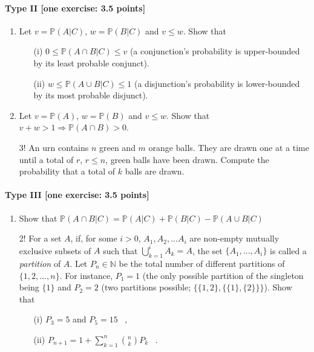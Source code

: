 \documentclass{article}
\begin{document}
\paragraph{Type II [one exercise: 3.5 points]}
\begin{enumerate}
	\item Let $v = \mathbb{P}(A|C)$, $w = \mathbb{P}(B|C)$ and $v \leq w$. Show that 
	\begin{itemize}
		\item [(i)] $0 \leq \mathbb{P}(A \cap B|C) \leq v$ (a conjunction's probability is upper-bounded by its least probable conjunct).	 \item[(ii)] $w \leq \mathbb{P}(A \cup B|C) \leq 1$ (a disjunction's probability is lower-bounded by its most probable disjunct).
	\end{itemize}
\item Let $v = \mathbb{P}(A)$, $w = \mathbb{P}(B)$ and $v \leq w$. Show that $v + w > 1 \Rightarrow \mathbb{P}(A \cap B) > 0$.
\item[3!] An urn contains $n$ green and $m$ orange balls. They are drawn one at a time until a total of $r$, $r \leq n$, green balls have been drawn. Compute the probability that a total of $k$ balls are drawn.

\end{enumerate}



\paragraph{Type III [one exercise: 3.5 points]}
\begin{enumerate}
	\item Show that $\mathbb{P}(A \cap B|C) = \mathbb{P}(A|C) + \mathbb{P}(B|C) - \mathbb{P}(A \cup B|C)$ %
	\item[2!] For a set $A$, if, for some $i > 0$, $A_1, A_2, ... A_i$ are non-empty mutually exclusive subsets of $A$ such that $\bigcup_{k=1}^{i}A_k = A$, the set $\{A_1, ..., A_i\}$ is called a \emph{partition} of $A$. Let $P_n \in \mathbb{N}$ be the total number of different partitions of $\{1,2,...,n\}$. For instance, $P_1 = 1$ (the only possible partition of the singleton being $\{1\}$ and $P_2 = 2$ (two partitions possible; $\{\{1,2\}, \{\{1\},\{2\}\}\}$). Show that
	\begin{itemize}
		\item[(i)] $P_3 = 5$ and $P_5 = 15$ \, ,
		\item[(ii)] $P_{n+1} = 1 + \sum_{k=1}^n \binom{n}{k}P_k$ \, .
	\end{itemize}

\end{enumerate}
\end{document}

